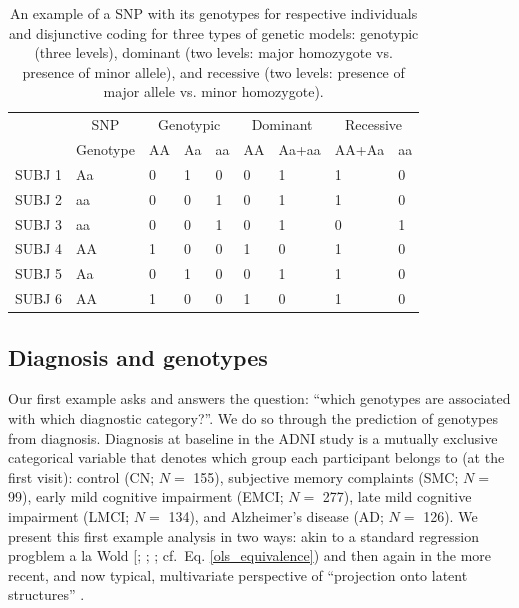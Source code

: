 \documentclass[12pt]{article}
\begin{document}
\begin{table}[!h]

\caption{\label{tab:unnamed-chunk-2}\label{table:snps_models_disj} An example of a SNP with its genotypes for respective individuals and disjunctive coding for three types of genetic models: genotypic (three levels), dominant (two levels: major homozygote vs. presence of minor allele), and recessive (two levels: presence of major allele vs. minor homozygote).}
\centering
\begin{tabular}{lllllllll}
\toprule
\multicolumn{1}{c}{ } & \multicolumn{1}{c}{SNP} & \multicolumn{3}{c}{Genotypic} & \multicolumn{2}{c}{Dominant} & \multicolumn{2}{c}{Recessive} \\
\cmidrule(l{2pt}r{2pt}){2-2} \cmidrule(l{2pt}r{2pt}){3-5} \cmidrule(l{2pt}r{2pt}){6-7} \cmidrule(l{2pt}r{2pt}){8-9}
  & Genotype & AA & Aa & aa & AA & Aa+aa & AA+Aa & aa\\
\midrule
SUBJ 1 & Aa & 0 & 1 & 0 & 0 & 1 & 1 & 0\\
SUBJ 2 & aa & 0 & 0 & 1 & 0 & 1 & 1 & 0\\
SUBJ 3 & aa & 0 & 0 & 1 & 0 & 1 & 0 & 1\\
SUBJ 4 & AA & 1 & 0 & 0 & 1 & 0 & 1 & 0\\
SUBJ 5 & Aa & 0 & 1 & 0 & 0 & 1 & 1 & 0\\
\addlinespace
SUBJ 6 & AA & 1 & 0 & 0 & 1 & 0 & 1 & 0\\
\bottomrule
\end{tabular}
\end{table}

\hypertarget{diagnosis-and-genotypes}{%
\subsection{Diagnosis and genotypes}\label{diagnosis-and-genotypes}}

\label{section:plscarda}

Our first example asks and answers the question: ``which genotypes are
associated with which diagnostic category?''. We do so through the
prediction of genotypes from diagnosis. Diagnosis at baseline in the
ADNI study is a mutually exclusive categorical variable that denotes
which group each participant belongs to (at the first visit): control
(CN; \(N=\) 155), subjective memory complaints (SMC; \(N=\) 99), early
mild cognitive impairment (EMCI; \(N=\) 277), late mild cognitive
impairment (LMCI; \(N=\) 134), and Alzheimer's disease (AD; \(N=\) 126).
We present this first example analysis in two ways: akin to a standard
regression progblem a la Wold {[}\citet{wold_soft_1975};
\citet{wold_collinearity_1984}; \citet{wold_principal_1987}; cf.~Eq.
\ref{ols_equivalence}) and then again in the more recent, and now
typical, multivariate perspective of ``projection onto latent
structures'' \citep{abdi_partial_2010-1}.
\end{document}
